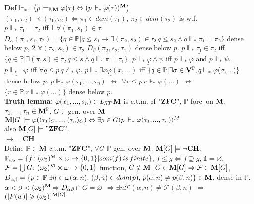 \documentclass[9pt]{article}
\newcommand{\class}[1]{{\bf #1}}
\newcommand{\Pp}{\mathbb{P}}
\newcommand{\mytitle}[1]{ {\bf $\rightarrow$ #1}\\}
\newcommand{\V}{\class{V}}
\newcommand{\M}{\class{M}}
\begin{document}
\begin{multicols*}{2}
{\bf Def} $\Vdash_*\colon \left(p\models_{\Pp,\class{M}}\varphi(\tau)\Leftrightarrow (p\Vdash_*\varphi(\tau))^\class{M}\right)$\\
$(\pi_1,\pi_2)\prec (\tau_1,\tau_2)\Leftrightarrow \pi_1\in dom(\tau_1),\,\pi_2\in dom(\tau_2)$ is w.f.\\
$\underline{p\Vdash_*\tau_1=\tau_2}$ iff
1 $\forall (\pi_1,s_1)\in\tau_1$ $D_\alpha(\pi_1,s_1,\tau_2)=\{q\in\Pp|q\leqslant s_1\to \exists(\pi_2,s_2)\in\tau_2\,q\leqslant s_2\wedge q\Vdash_*\pi_1=\pi_2\}$ dense below $p$, 2 $\forall(\pi_2,s_2)\in\tau_2$ $D_\beta(\pi_2,s_2,\tau_1)$ dense below $p$.
$\underline{p\Vdash_*\tau_1\in\tau_2}$ iff $\{q\in \Pp|\exists (\pi,s)\in\tau_2\,q\leqslant s\wedge q\Vdash_* \pi=\tau_1\}$.
$\underline{p\Vdash_*\varphi\wedge\psi}$ iff $p\Vdash_*\varphi$ and $p\Vdash_*\psi$.
$\underline{p\Vdash_*\neg\varphi}$ iff $\forall q\leqslant p\,q\not\Vdash_*\varphi$.
$\underline{p\Vdash_*\exists x\varphi(x,...)}$ iff $\{q\in \Pp|\exists \sigma\in\V^\Pp,q\Vdash_*\varphi(\sigma,...)\}$ dense below $p$.
$\underline{p\Vdash_*\varphi(\tau_1,...,\tau_n)}$ $\Leftrightarrow$ $\forall r\leqslant p\,r\Vdash_*\varphi(...)$ $\Leftrightarrow$ $\{r\in\Pp|r\Vdash_*\varphi(...)\}$ dense below $p$.\\
{\bf Truth lemma:} $\varphi(x_1,...,s_n)\in L_{ST}\,\class{M}$ is c.t.m. of "$\class{ZFC}$", $\Pp$ forc. on $\class{M}$, $\tau_1,...,\tau_n\in\class{M}^\Pp$, $G$ $\Pp$-gen. over $\class{M}$ $\class{M}[G]\models \varphi((\tau_1)_G,...,(\tau_n)_G)\Leftrightarrow\exists p\in G(p\Vdash_*\varphi(\tau_1,...,\tau_n))^M$\\
also $\class{M}[G]\models "\class{ZFC}"$.\\
\mytitle{$\neg$\class{CH}}
Define $\Pp\in\class{M}$ c.t.m. "$\class{ZFC}$", $\forall G$ $\Pp$-gen. over $\class{M}$, $\class{M}[G]\models\neg\class{CH}$.
$\Pp_{\omega_2}=\{f\colon (\omega_2)^\class{M}\times\omega\to\{0,1\}|dom(f)\,is\,finite\}$, $f\leqslant g\Leftrightarrow f\supseteq g$, $\mathbb{1}=\varnothing$.
$\mathcal{F}=\bigcup G\colon (\omega_2)^\class{M}\times\omega\to\{0,1\}$ function, $G\notin\class{M}$. $G\in \M[G]\Rightarrow\mathcal{F}\in\class{M}[G]$,\\
$D_{\alpha\beta}=\{p\in\Pp|\exists n\in\omega (\alpha,n),\,(\beta,n)\in dom(p),\,p(\alpha,n)\neq p(\beta, n)\}\in \M$, dense in $\Pp$. $\alpha<\beta<(\omega_2)^\M\Rightarrow D_{\alpha\beta}\cap G=\varnothing$ $\Rightarrow\exists n \mathcal{F}(\alpha, n)\neq\mathcal{F}(\beta, n)$ $\Rightarrow$ $(|P(w)|\geqslant (\omega_2))^{\M[G]}$\\

\end{multicols*}
\end{document}
